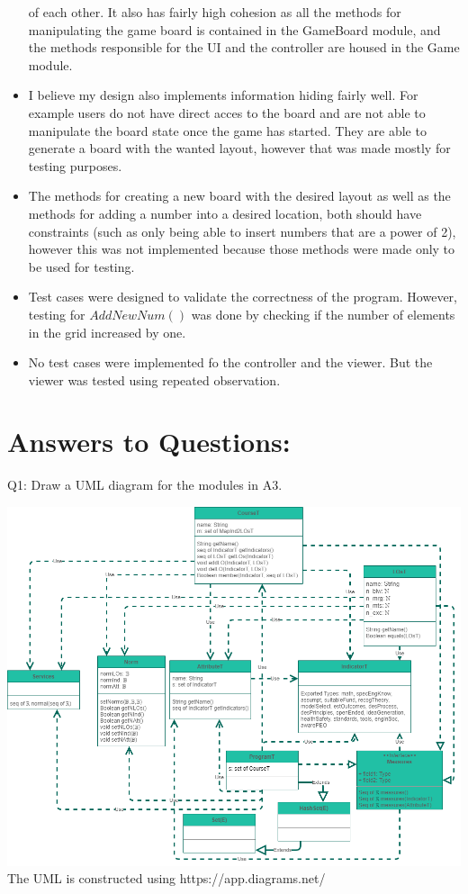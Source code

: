 \documentclass[12pt]{article}
\begin{document}
\begin{itemize}
    of each other. It also has fairly high cohesion as all the methods for
    manipulating the game board is contained in the GameBoard module, and
    the methods responsible for the UI and the controller are housed in the
    Game module.
    \item I believe my design also implements information hiding fairly
    well. For example users do not have direct acces to the board and are
    not able to manipulate the board state once the game has started. They
    are able to generate a board with the wanted layout, however that was
    made mostly for testing purposes.
    \item The methods for creating a new board with the desired layout as
    well as the methods for adding a number into a desired location, both
    should have constraints (such as only being able to insert numbers that
    are a power of 2), however this was not implemented because those
    methods were made only to be used for testing.
    \item Test cases were designed to validate the correctness of the
    program. However, testing for $AddNewNum()$ was done by checking if the
    number of elements in the grid increased by one.
    \item No test cases were implemented fo the controller and the viewer.
    But the viewer was tested using repeated observation. 
  
\end{itemize}

\newpage

\section*{Answers to Questions:}

Q1: Draw a UML diagram for the modules in A3.

\begin{center}
  \includegraphics[width=1.2\textwidth]{UML.png} \\
  The UML is constructed using https://app.diagrams.net/
\end{center}
\end{document}
